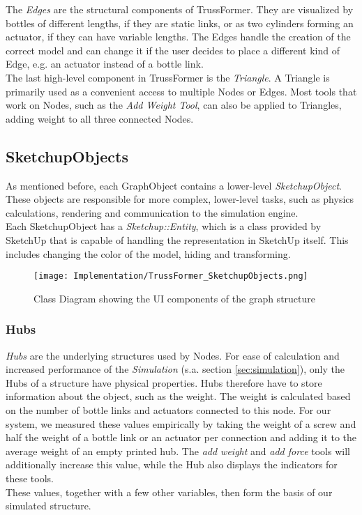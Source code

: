 The \textit{Edges} are the structural components of TrussFormer. They are visualized by bottles of different lengths, if they are static links, or as two cylinders forming an actuator, if they can have variable lengths. The Edges handle the creation of the correct model and can change it if the user decides to place a different kind of Edge, e.g. an actuator instead of a bottle link.\\
The last high-level component in TrussFormer is the \textit{Triangle}. A Triangle is primarily used as a convenient access to multiple Nodes or Edges. Most tools that work on Nodes, such as the \textit{Add Weight Tool}, can also be applied to Triangles, adding weight to all three connected Nodes.

\subsection{SketchupObjects}
As mentioned before, each GraphObject contains a lower-level \textit{SketchupObject}. These objects are responsible for more complex, lower-level tasks, such as physics calculations, rendering and communication to the simulation engine.\\
Each SketchupObject has a \textit{Sketchup::Entity}, which is a class provided by SketchUp that is capable of handling the representation in SketchUp itself. This includes changing the color of the model, hiding and transforming.
\begin{figure}[ht!]
    \texttt{[image: Implementation/TrussFormer\_SketchupObjects.png]}
    \centering
    \caption{Class Diagram showing the UI components of the graph structure}
    \label{fig:sketchup_objects}
\end{figure}

\subsubsection{Hubs}
\textit{Hubs} are the underlying structures used by Nodes. For ease of calculation and increased performance of the \textit{Simulation} (s.a. section \ref{sec:simulation}), only the Hubs of a structure have physical properties. Hubs therefore have to store information about the object, such as the weight. The weight is calculated based on the number of bottle links and actuators connected to this node. For our system, we measured these values empirically by taking the weight of a screw and half the weight of a bottle link or an actuator per connection and adding it to the average weight of an empty printed hub. The \textit{add weight} and \textit{add force} tools will additionally increase this value, while the Hub also displays the indicators for these tools.\\
These values, together with a few other variables, then form the basis of our simulated structure.

